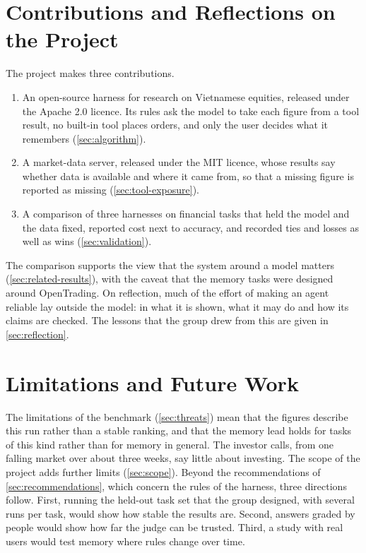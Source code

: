 \section{Contributions and Reflections on the Project}\label{sec:contributions}
The project makes three contributions.
\begin{enumerate}
  \item An open-source harness for research on Vietnamese equities, released under the Apache 2.0 licence.
  Its rules ask the model to take each figure from a tool result, no built-in tool places orders, and only the user decides what it remembers (\cref{sec:algorithm}).
  \item A market-data server, released under the MIT licence, whose results say whether data is available and where it came from, so that a missing figure is reported as missing (\cref{sec:tool-exposure}).
  \item A comparison of three harnesses on financial tasks that held the model and the data fixed, reported cost next to accuracy, and recorded ties and losses as well as wins (\cref{sec:validation}).
\end{enumerate}
The comparison supports the view that the system around a model matters (\cref{sec:related-results}), with the caveat that the memory tasks were designed around OpenTrading.
On reflection, much of the effort of making an agent reliable lay outside the model: in what it is shown, what it may do and how its claims are checked.
The lessons that the group drew from this are given in \cref{sec:reflection}.

\section{Limitations and Future Work}\label{sec:future}
The limitations of the benchmark (\cref{sec:threats}) mean that the figures describe this run rather than a stable ranking, and that the memory lead holds for tasks of this kind rather than for memory in general.
The investor calls, from one falling market over about three weeks, say little about investing.
The scope of the project adds further limits (\cref{sec:scope}).
Beyond the recommendations of \cref{sec:recommendations}, which concern the rules of the harness, three directions follow.
First, running the held-out task set that the group designed, with several runs per task, would show how stable the results are.
Second, answers graded by people would show how far the judge can be trusted.
Third, a study with real users would test memory where rules change over time.
